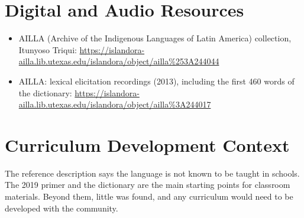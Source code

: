 \documentclass[12pt]{article}
\begin{document}
\section{Digital and Audio Resources}
\begin{itemize}
\item AILLA (Archive of the Indigenous Languages of Latin America) collection, Itunyoso Triqui: \url{https://islandora-ailla.lib.utexas.edu/islandora/object/ailla%253A244044}
\item AILLA: lexical elicitation recordings (2013), including the first 460 words of the dictionary: \url{https://islandora-ailla.lib.utexas.edu/islandora/object/ailla%3A244017}
\end{itemize}

\section{Curriculum Development Context}
The reference description says the language is not known to be taught in schools. The 2019 primer and the dictionary are the main starting points for classroom materials. Beyond them, little was found, and any curriculum would need to be developed with the community.
\end{document}
